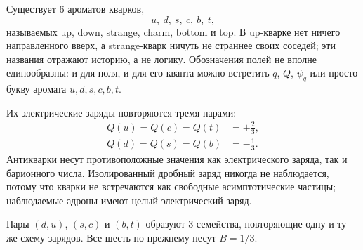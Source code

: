 \begin{classroomqa}
\end{classroomqa}

Существует 6 ароматов кварков,
\begin{equation}
u,\ d,\ s,\ c,\ b,\ t,
\end{equation}
называемых up, down, strange, charm, bottom и top. В up-кварке нет ничего направленного вверх, а strange-кварк ничуть не страннее своих соседей; эти названия отражают историю, а не логику. Обозначения полей не вполне единообразны: и для поля, и для его кванта можно встретить \(q\), \(Q\), \(\psi_q\) или просто букву аромата \(u,d,s,c,b,t\).

\begin{classroomqa}
\end{classroomqa}

Их электрические заряды повторяются тремя парами:
\begin{equation}
\begin{aligned}
Q(u)=Q(c)=Q(t)&=+\frac23,
\\
Q(d)=Q(s)=Q(b)&=-\frac13.
\end{aligned}
\end{equation}
Антикварки несут противоположные значения как электрического заряда, так и барионного числа. Изолированный дробный заряд никогда не наблюдается, потому что кварки не встречаются как свободные асимптотические частицы; наблюдаемые адроны имеют целый электрический заряд.

Пары \((d,u)\), \((s,c)\) и \((b,t)\) образуют 3 семейства, повторяющие одну и ту же схему зарядов. Все шесть по-прежнему несут \(B=1/3\).

\begin{classroomqa}
\end{classroomqa}


